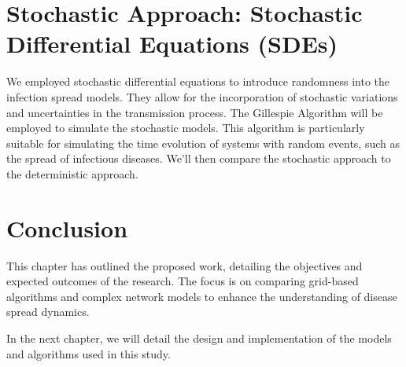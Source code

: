 \section{Stochastic Approach: Stochastic Differential Equations (SDEs)}
We employed stochastic differential equations to introduce randomness into the infection spread models. They allow for the incorporation of stochastic variations and uncertainties in the transmission process. The Gillespie Algorithm will be employed to simulate the stochastic models. This algorithm is particularly suitable for simulating the time evolution of systems with random events, such as the spread of infectious diseases. We'll then compare the stochastic approach to the deterministic approach.

\section{Conclusion}
This chapter has outlined the proposed work, detailing the objectives and expected outcomes of the research. The focus is on comparing grid-based algorithms and complex network models to enhance the understanding of disease spread dynamics.

In the next chapter, we will detail the design and implementation of the models and algorithms used in this study.